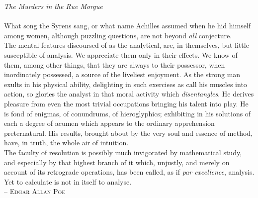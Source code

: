 \documentclass{article}
\begin{document}
\Huge
\textit{The Murders in the Rue Morgue}\\\\
What song the Syrens sang, or what name Achilles assumed when he hid himself among women, although puzzling questions, are not beyond \textit{all} conjecture.\\\indent
The mental features discoursed of as the analytical, are, in themselves, but little susceptible of analysis. 
We appreciate them only in their effects. 
We know of them, among other things, that they are always to their possessor, when inordinately possessed, a source of the liveliest enjoyment.
As the strong man exults in his physical ability, delighting in such exercises as call his muscles into action, so glories the analyst in that moral activity which \textit{disentangles}.
He derives pleasure from even the most trivial occupations bringing his talent into play.
He is fond of enigmas, of conundrums, of hieroglyphics; exhibiting in his solutions of each a degree of acumen which appears to the ordinary apprehension preternatural.
His results, brought about by the very soul and essence of method, have, in truth, the whole air of intuition.\\\indent
The faculty of resolution is possibly much invigorated by mathematical study, and especially by that highest branch of it which, unjustly, and merely on account of its retrograde operations, has been called, as if \textit{par excellence}, analysis. 
Yet to calculate is not in itself to analyse.\\
\null\hfill -- \textsc{Edgar Allan Poe}
\end{document}
